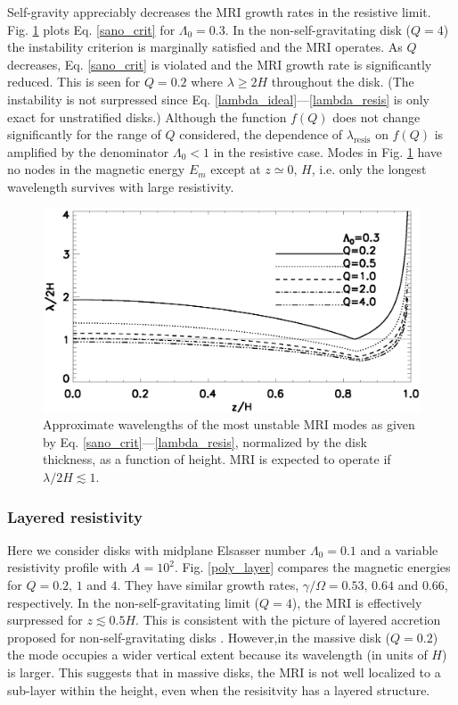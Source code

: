 Self-gravity appreciably decreases the MRI growth rates in the
resistive limit. Fig. \ref{lambda_poly_resis} plots 
Eq. \ref{sano_crit} for $\Lambda_0=0.3$. In the non-self-gravitating
disk ($Q=4$) the instability criterion is marginally satisfied and the
MRI operates. As $Q$ decreases, 
Eq. \ref{sano_crit} is violated and the MRI growth rate is
significantly reduced. This is seen for $Q=0.2$ where $\lambda \geq 2H$ throughout
the disk. (The instability is not surpressed since
Eq. \ref{lambda_ideal}---\ref{lambda_resis} is only exact for
unstratified disks.) Although the function 
$f(Q)$ does not change significantly for the range of $Q$ considered,
the dependence of $\lambda_\mathrm{resis}$ on $f(Q)$ is amplified by the
denominator $\Lambda_0<1$ in the resistive case. Modes in
Fig. \ref{lambda_poly_resis} have no nodes in the magnetic energy
$E_m$ except at $z\simeq0,\,H$, i.e. only the longest wavelength survives
with large resistivity. 

\begin{figure}
  \includegraphics[width=\linewidth]{figures/lambda_poly_uniresis}
  \caption{Approximate wavelengths of the most unstable MRI modes as given by
    Eq. \ref{sano_crit}---\ref{lambda_resis}, normalized by the 
    disk thickness, as a function of height. MRI is expected to
    operate if $\lambda/2H\lesssim 1$. 
    \label{lambda_poly_resis}}
\end{figure}



\subsubsection{Layered 
  resistivity} 
Here we consider disks with midplane Elsasser number $\Lambda_0=0.1$
and a variable resistivity profile with
$A=10^2$. Fig. \ref{poly_layer} compares the magnetic  
energies for $Q=0.2,\,1$ and $4$. They have similar growth rates, $\gamma/\Omega
= 0.53,\,0.64$ and $0.66$, respectively. In the non-self-gravitating
limit ($Q=4$), the MRI is effectively surpressed for
$z\lesssim0.5H$. This is consistent with the picture of layered
accretion proposed for non-self-gravitating disks \citep{gammie96,fleming03}. 
However,in the massive disk ($Q=0.2$) the mode occupies a wider vertical
extent because its wavelength (in units of $H$) is larger. This
suggests that in massive disks, the MRI is not well localized to a
sub-layer within the height, even when the resisitvity has a layered
structure.  


